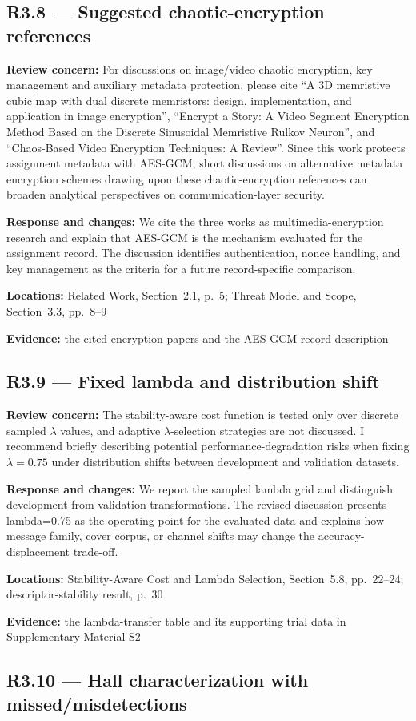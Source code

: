 \documentclass[12pt,a4paper]{article}
\newcommand{\revcomment}[1]{\par\medskip\noindent\textbf{Review concern:} #1\par\smallskip}
\newcommand{\responsechanges}[1]{\par\noindent\textbf{Response and changes:} #1\par}
\newcommand{\locations}[1]{\par\noindent\textbf{Locations:} #1\par}
\newcommand{\evidence}[1]{\par\noindent\textbf{Evidence:} #1\par\smallskip}
\begin{document}
\subsection*{R3.8 --- Suggested chaotic-encryption references}

\revcomment{For discussions on image/video chaotic encryption, key management and auxiliary metadata protection, please cite ``A 3D memristive cubic map with dual discrete memristors: design, implementation, and application in image encryption'', ``Encrypt a Story: A Video Segment Encryption Method Based on the Discrete Sinusoidal Memristive Rulkov Neuron'', and ``Chaos-Based Video Encryption Techniques: A Review''. Since this work protects assignment metadata with AES-GCM, short discussions on alternative metadata encryption schemes drawing upon these chaotic-encryption references can broaden analytical perspectives on communication-layer security.}
\responsechanges{We cite the three works as multimedia-encryption research and explain that AES-GCM is the mechanism evaluated for the assignment record. The discussion identifies authentication, nonce handling, and key management as the criteria for a future record-specific comparison.}
\locations{Related Work, Section~2.1, p.~5; Threat Model and Scope, Section~3.3, pp.~8--9}
\evidence{the cited encryption papers and the AES-GCM record description}

\subsection*{R3.9 --- Fixed lambda and distribution shift}

\revcomment{The stability-aware cost function is tested only over discrete sampled $\lambda$ values, and adaptive $\lambda$-selection strategies are not discussed. I recommend briefly describing potential performance-degradation risks when fixing $\lambda=0.75$ under distribution shifts between development and validation datasets.}
\responsechanges{We report the sampled lambda grid and distinguish development from validation transformations. The revised discussion presents lambda=0.75 as the operating point for the evaluated data and explains how message family, cover corpus, or channel shifts may change the accuracy-displacement trade-off.}
\locations{Stability-Aware Cost and Lambda Selection, Section~5.8, pp.~22--24; descriptor-stability result, p.~30}
\evidence{the lambda-transfer table and its supporting trial data in Supplementary Material S2}

\subsection*{R3.10 --- Hall characterization with missed/misdetections}
\end{document}
